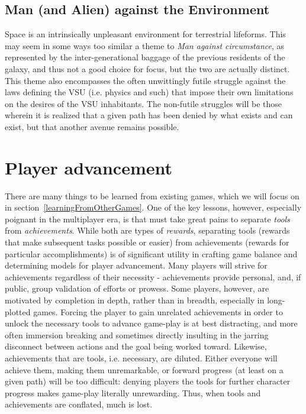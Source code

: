 \subsection{Man (and Alien) against the Environment}

Space is an intrinsically unpleasant environment for terrestrial
lifeforms. This may seem in some ways too similar a theme to {\em Man
against circumstance}, as represented by the inter-generational
baggage of the previous residents of the galaxy, and thus not a good
choice for focus, but the two are actually distinct. This theme also
encompasses the often unwittingly futile struggle against the laws
defining the VSU (i.e. physics and such) that impose their own
limitations on the desires of the VSU inhabitants. The non-futile
struggles will be those wherein it is realized that a given path has
been denied by what exists and can exist, but that another avenue
remains possible.

\section{Player advancement}

There are many things to be learned from existing games, which we will
focus on in section~\ref{learningFromOtherGames}. One of the key
lessons, however, especially poignant in the multiplayer era, is that
must take great pains to separate {\em tools} from {\em
achievements}. While both are types of {\em rewards}, separating tools
(rewards that make subsequent tasks possible or easier) from
achievements (rewards for particular accomplishments) is of
significant utility in crafting game balance and determining models
for player advancement. Many players will strive for achievements
regardless of their necessity - achievements provide personal, and, if
public, group validation of efforts or prowess. Some players, however,
are motivated by completion in depth, rather than in breadth,
especially in long-plotted games. Forcing the player to gain unrelated
achievements in order to unlock the necessary tools to advance
game-play is at best distracting, and more often immersion breaking and
sometimes directly insulting in the jarring disconnect between actions
and the goal being worked toward. Likewise, achievements that are
tools, i.e.  necessary, are diluted. Either everyone will achieve
them, making them unremarkable, or forward progress (at least on a
given path) will be too difficult: denying players the tools for
further character progress makes game-play literally unrewarding.
Thus, when tools and achievements are conflated, much is lost.


